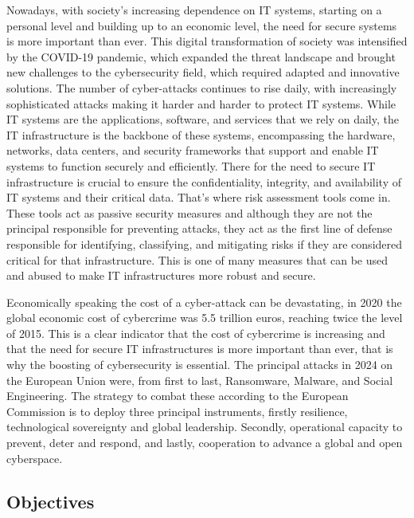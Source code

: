 Nowadays, with society's increasing dependence on IT systems, starting on a personal level and building up to an economic level,
 the need for secure systems is more important than ever. This digital transformation of society was intensified by the COVID-19 pandemic,
 which expanded the threat landscape and brought new challenges to the cybersecurity field, which required adapted and innovative solutions.
The number of cyber-attacks continues to rise daily, with increasingly sophisticated attacks making it harder and harder to protect IT systems\cite{cybersecurity-strategy}.
While IT systems are the applications, software, and services that we rely on daily, the IT infrastructure is the backbone of these systems,
 encompassing the hardware, networks, data centers, and security frameworks that support and enable IT systems to function securely and efficiently.
There for the need to secure IT infrastructure is crucial to ensure the confidentiality, integrity, and availability of IT systems and their critical data.
That's where risk assessment tools come in. These tools act as passive security measures and although they are not the principal responsible for preventing attacks,
they act as the first line of defense responsible for identifying, classifying, and mitigating risks if they are considered critical for that infrastructure.
This is one of many measures that can be used and abused to make IT infrastructures more robust and secure.
\par Economically speaking the cost of a cyber-attack can be devastating, in 2020 the global economic cost of cybercrime was 5.5 trillion euros\cite{cybercrime-cost},
 reaching twice the level of 2015. This is a clear indicator that the cost of cybercrime is increasing and that the need for secure IT infrastructures is more important than ever,
 that is why the boosting of cybersecurity is essential. The principal attacks in 2024 on the European Union were, from first to last, Ransomware, Malware, and Social Engineering\cite{ENISA-Threat-landscape-2024}.
The strategy to combat these according to the European Commission is to deploy three principal instruments, firstly resilience, technological sovereignty and global leadership.
Secondly, operational capacity to prevent, deter and respond, and lastly, cooperation to advance a global and open cyberspace\cite{cybersecurity-strategy}.




\subsection{Objectives}
\label{sub:objectives}


